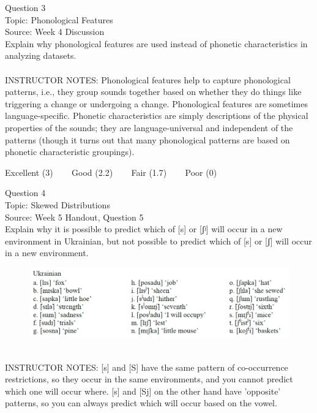 \documentclass[12pt]{article}
\begin{document}
{\large Question 3}\\

Topic: Phonological Features\\
Source: Week 4 Discussion\\

Explain why phonological features are used instead of phonetic characteristics in analyzing datasets.\\


~\\
INSTRUCTOR NOTES: Phonological features help to capture phonological patterns, i.e., they group sounds together based on whether they do things like triggering a change or undergoing a change. Phonological features are sometimes language-specific. Phonetic characteristics are simply descriptions of the physical properties of the sounds; they are language-universal and independent of the patterns (though it turns out that many phonological patterns are based on phonetic characteristic groupings).


\vfill
Excellent (3) ~~~ Good (2.2) ~~~ Fair (1.7) ~~~ Poor (0)
\newpage

{\large Question 4}\\

Topic: Skewed Distributions\\
Source: Week 5 Handout, Question 5\\

Explain why it is possible to predict which of [s] or [ʃʲ] will occur in a new environment in Ukrainian, but not possible to predict which of [s] or [ʃ] will occur in a new environment.\\

\begin{figure}[H]
\includegraphics{../images/ukrainian.png}
\end{figure}

~\\
INSTRUCTOR NOTES: [s] and [S] have the same pattern of co-occurrence restrictions, so they occur in the same environments, and you cannot predict which one will occur where. [s] and [Sj] on the other hand have 'opposite' patterns, so you can always predict which will occur based on the vowel.
\end{document}
